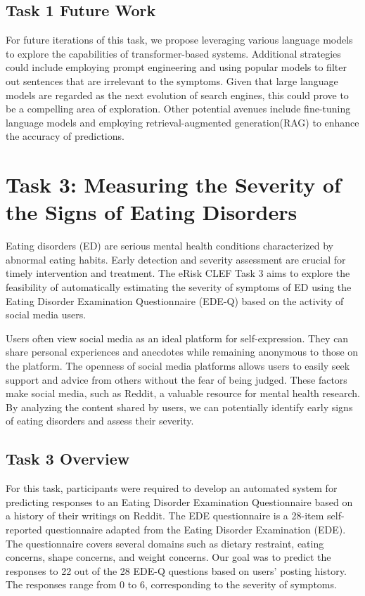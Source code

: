 \documentclass[]{style/ceurart}
\begin{document}
\subsection{Task 1 Future Work}

For future iterations of this task, we propose leveraging various language models to explore the capabilities of transformer-based systems. Additional strategies could include employing prompt engineering and using popular models to filter out sentences that are irrelevant to the symptoms. Given that large language models are regarded as the next evolution of search engines, this could prove to be a compelling area of exploration. Other potential avenues include fine-tuning language models and employing retrieval-augmented generation(RAG) to enhance the accuracy of predictions.

\section{Task 3: Measuring the Severity of the Signs of Eating Disorders}

Eating disorders (ED) are serious mental health conditions characterized by abnormal eating habits. Early detection and severity assessment are crucial for timely intervention and treatment. The eRisk CLEF Task 3 aims to explore the feasibility of automatically estimating the severity of symptoms of ED using the Eating Disorder Examination Questionnaire (EDE-Q) based on the activity of social media users.

Users often view social media as an ideal platform for self-expression. They can share personal experiences and anecdotes while remaining anonymous to those on the platform. The openness of social media platforms allows users to easily seek support and advice from others without the fear of being judged. These factors make social media, such as Reddit, a valuable resource for mental health research. By analyzing the content shared by users, we can potentially identify early signs of eating disorders and assess their severity.


\subsection{Task 3 Overview}

For this task, participants were required to develop an automated system for predicting responses to an Eating Disorder Examination Questionnaire based on a history of their writings on Reddit. The EDE questionnaire is a 28-item self-reported questionnaire adapted from the Eating Disorder Examination (EDE). The questionnaire covers several domains such as dietary restraint, eating concerns, shape concerns, and weight concerns. Our goal was to predict the responses to 22 out of the 28 EDE-Q questions based on users' posting history. The responses range from 0 to 6, corresponding to the severity of symptoms.
\end{document}

